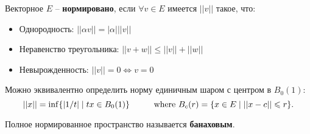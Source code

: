 
\begin{to_def}
	Векторное $E$ -- \textbf{нормировано}, если $\forall v \in E$ имеется $||v||$ такое, что:
	\begin{itemize}
		\item Однородность: $||\alpha v|| = |\alpha| ||v||$
		\item Неравенство треугольника: $||v + w|| \leq ||v|| + ||w||$
		\item Невырожденность: $||v|| = 0 \Leftrightarrow v = 0$
	\end{itemize}
\end{to_def}

Можно эквивалентно определить норму единичным шаром с центром в $B_0(1)$:
\begin{equation*}
	||x|| = \inf \{|1/t| \mid t x \in B_0(1)\}
	\hspace{1 cm}
	\text{where }
	B_{c}(r) = \{x \in E \mid ||x-c|| \leq r\}.
\end{equation*}

\begin{to_def}
	Полное нормированное пространство называется \textbf{банаховым}.
\end{to_def}